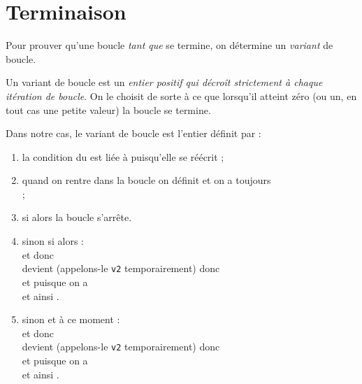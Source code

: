 \section{Terminaison}

Pour prouver qu'une boucle \textit{tant que} se termine, on détermine un \textit{variant} de boucle.

\begin{definition}[]
Un variant de boucle est un \textit{entier positif qui décroît strictement à chaque itération de boucle}. On le choisit de sorte à ce que lorsqu'il atteint zéro (ou un, en tout cas une petite valeur) la boucle se termine.\\
\end{definition}

Dans notre cas, le variant de boucle est l'entier  définit par  :
\begin{enumerate}[--]
    \item   la condition du  est liée à  puisqu'elle se réécrit ;
    \item   quand on rentre dans la boucle on définit  et on a toujours \\
    ;
    \item   si  alors la boucle s'arrête.
        
    \item   sinon si  alors :\\
             et donc\\
             devient (appelons-le \texttt{v2} temporairement)  donc\\
             et puisque  on a\\
             et ainsi .
    \item   sinon  et à ce moment :\\
             et donc\\
             devient (appelons-le \texttt{v2} temporairement)  donc\\
             et puisque  on a\\
             et ainsi .         
\end{enumerate}

